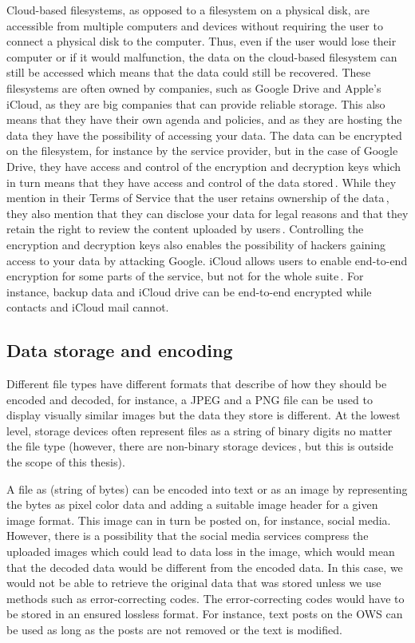 Cloud-based filesystems, as opposed to a filesystem on a physical disk, are accessible from multiple computers and devices without requiring the user to connect a physical disk to the computer. Thus, even if the user would lose their computer or if it would malfunction, the data on the \mbox{cloud-based} filesystem can still be accessed which means that the data could still be recovered. These filesystems are often owned by companies, such as Google Drive and Apple's iCloud, as they are big companies that can provide reliable storage. This also means that they have their own agenda and policies, and as they are hosting the data they have the possibility of accessing your data. The data can be encrypted on the filesystem, for instance by the service provider, but in the case of Google Drive, they have access and control of the encryption and decryption keys which in turn means that they have access and control of the data stored\,\cite{johnsonGoogleDriveSecure2021}. While they mention in their Terms of Service that the user retains ownership of the data\,\cite{googleGoogleDriveTerms}, they also mention that they can disclose your data for legal reasons and that they retain the right to review the content uploaded by users\,\cite{googleGoogleTermsService}. Controlling the encryption and decryption keys also enables the possibility of hackers gaining access to your data by attacking Google. iCloud allows users to enable \mbox{end-to-end} encryption for some parts of the service, but not for the whole suite\,\cite{appleinc.ICloudDataSecurity}. For instance, backup data and iCloud drive can be \mbox{end-to-end} encrypted while contacts and iCloud mail cannot.

\subsection{Data storage and encoding}
\label{sec:data_storage}
Different file types have different formats that describe of how they should be encoded and decoded, for instance, a JPEG and a PNG file can be used to display visually similar images but the data they store is different. At the lowest level, storage devices often represent files as a string of binary digits no matter the file type (however, there are \mbox{non-binary} storage devices\,\cite{MultistateDataStorage2020}, but this is outside the scope of this thesis).

A file as (string of bytes) can be encoded into text or as an image by representing the bytes as pixel color data and adding a suitable image header for a given image format. This image can in turn be posted on, for instance, social media. However, there is a possibility that the social media services compress the uploaded images which could lead to data loss in the image, which would mean that the decoded data would be different from the encoded data. In this case, we would not be able to retrieve the original data that was stored unless we use methods such as \mbox{error-correcting} codes. The \mbox{error-correcting} codes would have to be stored in an ensured lossless format. For instance, text posts on the \gls{OWS} can be used as long as the posts are not removed or the text is modified.